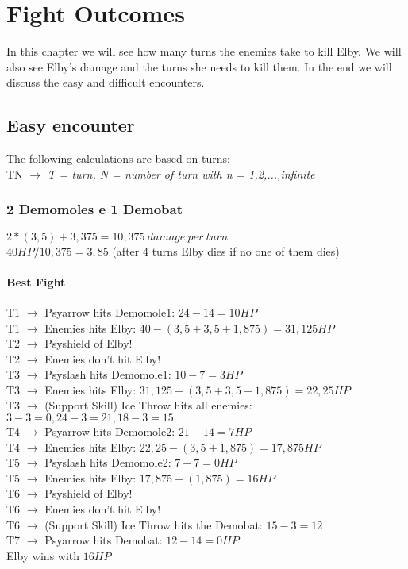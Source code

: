 \section{Fight Outcomes}
In this chapter we will see how many turns the enemies take to kill Elby. We will also see Elby's damage and the turns she needs to kill them. In the end we will discuss the easy and difficult encounters.

\subsection{Easy encounter}
The following calculations are based on turns:\\

TN $\rightarrow$ \textit{T = turn, N = number of turn with n = {1,2,...,infinite}}

\subsubsection*{2 Demomoles e 1 Demobat}
$2*(3,5)+3,375 = 10,375\:damage\:per\:turn$ \\
$40 HP/10,375 =3,85$ (after 4 turns Elby dies if no one of them dies)\\

\paragraph*{Best Fight\\}
T1 $\rightarrow$ Psyarrow hits Demomole1: $24-14 = 10 HP$\\
T1 $\rightarrow$ Enemies hits Elby: $40 - (3,5+3,5+1,875) = 31,125 HP$\\
T2 $\rightarrow$ Psyshield of Elby!\\
T2 $\rightarrow$ Enemies don’t hit Elby!\\
T3 $\rightarrow$ Psyslash hits Demomole1: $10 - 7 = 3 HP$\\
T3 $\rightarrow$ Enemies hits Elby: $31,125 - (3,5+3,5+1,875) = 22,25 HP$\\
T3 $\rightarrow$ (Support Skill) Ice Throw hits all enemies: $3 - 3 = 0, 24 - 3 = 21, 18 - 3 = 15$\\
T4 $\rightarrow$ Psyarrow hits Demomole2: $21-14 = 7 HP$\\
T4 $\rightarrow$ Enemies hits Elby: $22,25 - (3,5+1,875) = 17,875 HP$\\
T5 $\rightarrow$ Psyslash hits Demomole2: $7 - 7 = 0 HP$\\
T5 $\rightarrow$ Enemies hits Elby: $17,875 - (1,875) = 16 HP$\\
T6 $\rightarrow$ Psyshield of Elby!\\
T6 $\rightarrow$ Enemies don’t hit Elby!\\
T6 $\rightarrow$ (Support Skill) Ice Throw hits the Demobat: $15 - 3 = 12$\\
T7 $\rightarrow$ Psyarrow hits Demobat: $12-14 = 0 HP$\\
Elby wins with $16 HP$

